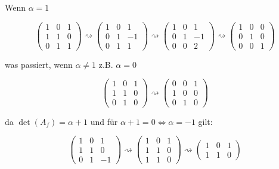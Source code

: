 \documentclass[main.tex]{subfiles}
\begin{document}
Wenn $\alpha = 1$

$$
    \begin{pmatrix}
        1 & 0 & 1 \\
        1 & 1 & 0 \\
        0 & 1 & 1 
    \end{pmatrix}
    \rightsquigarrow 
    \begin{pmatrix}
        1 & 0 & 1 \\
        0 & 1 & -1 \\
        0 & 1 & 1 
    \end{pmatrix}
    \rightsquigarrow 
    \begin{pmatrix}
        1 & 0 & 1 \\
        0 & 1 & -1 \\
        0 & 0 & 2 
    \end{pmatrix}
    \rightsquigarrow 
    \begin{pmatrix}
        1 & 0 & 0 \\
        0 & 1 & 0 \\
        0 & 0 & 1
    \end{pmatrix}
$$

was passiert, wenn $\alpha \neq 1$ z.B. $\alpha = 0$

$$
    \begin{pmatrix}
        1 & 0 & 1 \\
        1 & 1 & 0 \\
        0 & 1 & 0 
    \end{pmatrix}
    \rightsquigarrow 
    \begin{pmatrix}
        0 & 0 & 1 \\
        1 & 0 & 0 \\
        0 & 1 & 0 
    \end{pmatrix}
$$

da $\det (A_f) = \alpha + 1$ und für $\alpha + 1 = 0 \Leftrightarrow \alpha = -1$ gilt:

$$
    \begin{pmatrix}
        1 & 0 & 1 \\
        1 & 1 & 0 \\
        0 & 1 & -1 
    \end{pmatrix}
    \rightsquigarrow 
    \begin{pmatrix}
        1 & 0 & 1 \\
        1 & 1 & 0 \\
        1 & 1 & 0 
    \end{pmatrix}
    \rightsquigarrow 
    \begin{pmatrix}
        1 & 0 & 1 \\
        1 & 1 & 0
    \end{pmatrix}
$$
\end{document}
